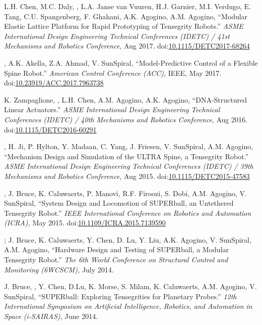 \documentclass[letterpaper]{deedy-resume} %
\newcommand\doilink[1]{\href{http://dx.doi.org/#1}{#1}}
\newcommand\doi[1]{doi:\doilink{#1}}
\begin{document}
{\begin{etaremune}[itemsep=0.1cm]
\item L.H. Chen, M.C. Daly, \underline{{}}, L.A. Janse van Vuuren, H.J. Garnier, M.I. Verdugo, E. Tang, C.U. Spangenberg, F. Ghahani, A.K. Agogino, A.M. Agogino, ``Modular Elastic Lattice Platform for Rapid Prototyping of Tensegrity Robots.'' {\it  ASME International Design Engineering Technical Conferences (IDETC) / 41st Mechanisms and Robotics Conference}, Aug 2017. \doi{10.1115/DETC2017-68264}

\item \underline{{}}, A.K. Akella, Z.A. Ahmad, V. SunSpiral, ``Model-Predictive Control of a Flexible Spine Robot.'' {\it American Control Conference (ACC)}, IEEE, May 2017. \doi{10.23919/ACC.2017.7963738}

\item K. Zampaglione, \underline{{}}, L.H. Chen, A.M. Agogino,  A.K. Agogino, ``DNA-Structured Linear Actuators.'' {\it ASME International Design Engineering Technical Conferences (IDETC) / 40th Mechanisms and Robotics Conference}, Aug 2016. \doi{10.1115/DETC2016-60291}
  
\item \underline{{}}, H. Ji, P. Hylton, Y. Madaan, C. Yang, J. Friesen, V. SunSpiral, A.M. Agogino, ``Mechanism Design and Simulation of the ULTRA Spine, a Tensegrity Robot.'' {\it ASME International Design Engineering Technical Conferences (IDETC) / 39th Mechanisms and Robotics Conference}, Aug 2015. \doi{10.1115/DETC2015-47583}

\item \underline{{}}, J. Bruce, K. Caluwaerts, P. Manovi, R.F. Firoozi, S. Dobi, A.M. Agogino, V. SunSpiral, ``System Design and Locomotion of SUPERball, an Untethered Tensegrity Robot.'' {\it IEEE International Conference on Robotics and Automation (ICRA),} May 2015. \doi{10.1109/ICRA.2015.7139590}

\item \underline{{}}; J. Bruce, K. Caluwaerts, Y. Chen, D. Lu, Y. Liu, A.K. Agogino, V. SunSpiral, A.M. Agogino, ``Hardware Design and Testing of SUPERball, a Modular Tensegrity Robot.'' {\it The 6th World Conference on Structural Control and Monitoring (6WCSCM),} July 2014.

\item J. Bruce, \underline{{}}, Y. Chen, D.Lu, K. Morse, S. Milam, K. Caluwaerts, A.M. Agogino, V. SunSpiral, ``SUPERball: Exploring Tensegrities for Planetary Probes.'' {\it 12th International Symposium on Artificial Intelligence, Robotics, and Automation in Space (i-SAIRAS),} June 2014.


\end{etaremune}}
\end{document}
